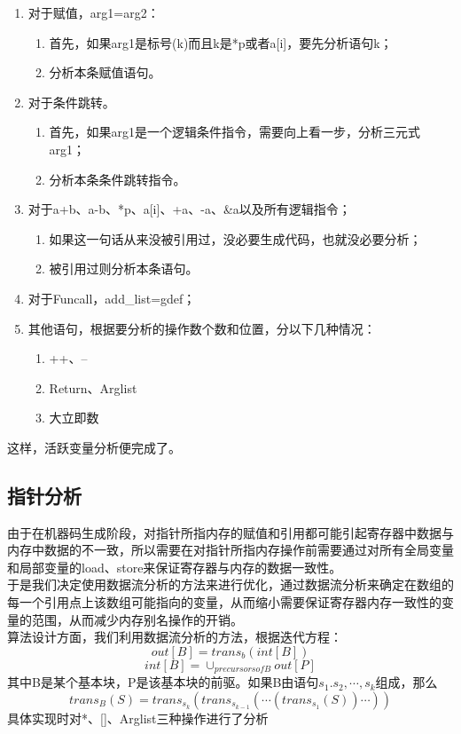 \documentclass[12pt,a4paper,Flow]{report}
\begin{document}
\begin{enumerate}
\item 对于赋值，arg1=arg2：
\begin{enumerate}
\item 首先，如果arg1是标号(k)而且k是*p或者a[i]，要先分析语句k；
\item 分析本条赋值语句。
\end{enumerate}
\item 对于条件跳转。
\begin{enumerate}
\item 首先，如果arg1是一个逻辑条件指令，需要向上看一步，分析三元式arg1；
\item 分析本条条件跳转指令。
\end{enumerate}
\item 对于a+b、a-b、*p、a[i]、+a、-a、\&a以及所有逻辑指令；
\begin{enumerate}
\item 如果这一句话从来没被引用过，没必要生成代码，也就没必要分析；
\item 被引用过则分析本条语句。
\end{enumerate}
\item 对于Funcall，add\_list=gdef；
\item 其他语句，根据要分析的操作数个数和位置，分以下几种情况：
\begin{enumerate}
\item ++、--
\item Return、Arglist
\item 大立即数
\end{enumerate}
\end{enumerate}
这样，活跃变量分析便完成了。\\
\subsection{指针分析}
由于在机器码生成阶段，对指针所指内存的赋值和引用都可能引起寄存器中数据与内存中数据的不一致，所以需要在对指针所指内存操作前需要通过对所有全局变量和局部变量的load、store来保证寄存器与内存的数据一致性。\\
\indent 于是我们决定使用数据流分析的方法来进行优化，通过数据流分析来确定在数组的每一个引用点上该数组可能指向的变量，从而缩小需要保证寄存器内存一致性的变量的范围，从而减少内存别名操作的开销。\\
\indent 算法设计方面，我们利用数据流分析的方法，根据迭代方程：
\begin{displaymath}
  out[B] = trans_b(int[B])
\end{displaymath}
\begin{displaymath}
  int[B]=\cup_{precursors{}of{}B} out[P]
\end{displaymath}
其中B是某个基本块，P是该基本块的前驱。如果B由语句$s_1.s_2, \cdots,s_k$组成，那么
\begin{displaymath}
  trans_B(S) = trans_{s_k}(trans_{s_{k-1}}(\cdots(trans_{s_1}(S))\cdots))
\end{displaymath}
具体实现时对*、[]、Arglist三种操作进行了分析
\end{document}
